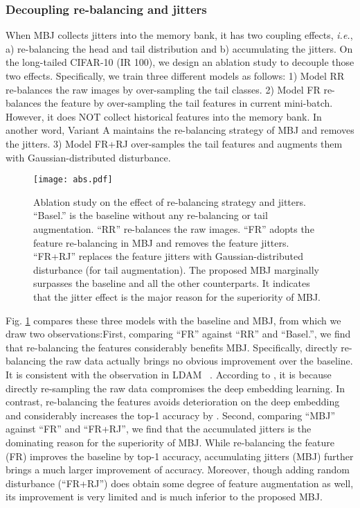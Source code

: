 \documentclass[final]{cvpr}
\def\ie{\textit{i.e.}}
\begin{document}
\subsubsection{Decoupling re-balancing and jitters} \label{sec:abs_3}

When MBJ collects jitters into the memory bank, it has two coupling effects, \ie, a) re-balancing the head and tail distribution and b) accumulating the jitters. On the long-tailed CIFAR-10 (IR 100), we design an ablation study to decouple those two effects.
Specifically, we train three different models as follows:
1) Model RR re-balances the raw images by over-sampling the tail classes.
2) Model FR re-balances the feature by over-sampling the tail features in current mini-batch. However, it does NOT collect historical features into the memory bank. In another word, Variant A maintains the re-balancing strategy of MBJ and removes the jitters.
3) Model FR+RJ over-samples the tail features and augments them with 
Gaussian-distributed disturbance.


\begin{figure}[h] 
\small 
	\centering 
	\texttt{[image: abs.pdf]} 
	\vspace{-3mm}
	\caption{Ablation study on the effect of re-balancing strategy and jitters.  ``Basel.'' is the baseline without any re-balancing or tail augmentation. ``RR'' re-balances the raw images. ``FR'' adopts the feature re-balancing in MBJ and removes the feature jitters. ``FR+RJ'' replaces the feature jitters with Gaussian-distributed disturbance (for tail augmentation). The proposed MBJ marginally surpasses the baseline and all the other counterparts. It indicates that the jitter effect is the major reason for the superiority of MBJ.}
	\label{fig:nb}
	\vspace{-4mm}
\end{figure}
Fig. \ref{fig:nb} compares these three models with the baseline and MBJ, from which we draw two observations:First, comparing ``FR'' against ``RR'' and ``Basel.'', we find that re-balancing the features considerably benefits MBJ. Specifically, directly re-balancing the raw data actually brings no obvious improvement over the baseline. It is consistent with the observation in LDAM ~\cite{LDAM}. According to \cite{LDAM, BBN}, it is because directly re-sampling the raw data compromises the deep embedding learning. In contrast, re-balancing the features avoids deterioration on the deep embedding and considerably increases the top-1 accuracy by . Second, comparing ``MBJ'' against ``FR'' and ``FR+RJ'', we find that the accumulated jitters is the dominating reason for the superiority of MBJ. While re-balancing the feature (FR) improves the baseline by  top-1 accuracy, accumulating jitters (MBJ) further brings a much larger improvement of  accuracy. Moreover, though adding random disturbance (``FR+RJ'') does obtain some degree of feature augmentation as well, its improvement is very limited and is much inferior to the proposed MBJ. 
\end{document}
